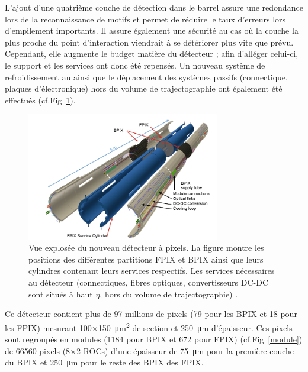 L'ajout d'une quatrième couche de détection dans le barrel assure une redondance lors de la reconnaissance de motifs et permet de réduire le taux d'erreurs lors d'empilement importants. Il assure également une sécurité au cas où la couche la plus proche du point d'interaction viendrait à se détériorer plus vite que prévu. Cependant, elle augmente le budget matière du détecteur ; afin d'alléger celui-ci, le support et les services ont donc été repensés. Un nouveau système de refroidissement au  ainsi que le déplacement des systèmes passifs (connectique, plaques d'électronique) hors du volume de trajectographie ont également été effectués (cf.Fig~\ref{pixel2}).

\begin{figure}[ht!]
	\centering
	\includegraphics[width=0.75\textwidth]{CMS/pixel3.png}
	\captionsetup{type=figure}\caption{Vue explosée du nouveau détecteur à pixels. La figure montre les positions des différentes partitions FPIX et BPIX ainsi que leurs cylindres contenant leurs services respectifs. Les services nécessaires au détecteur (connectiques, fibres optiques, convertisseurs DC-DC sont situés à haut $\eta$, hors du volume de trajectographie) \cite{Dominguez:1481838}.}
	\label{pixel2}
\end{figure}

Ce détecteur contient plus de \num{97} millions de pixels (\num{79} pour les BPIX et \num{18} pour les FPIX) mesurant \num{100}$\times$\SI{150}{\square\micro\meter} de section et \SI{250}{\micro\meter} d'épaisseur. Ces pixels sont regroupés en modules (\num{1184} pour BPIX et \num{672} pour FPIX) (cf.Fig~\ref{module}) de \num{66560} pixels  (\num{8}$\times$\num{2} ROCs) d'une épaisseur de \SI{75}{\micro\meter} pour la première couche du BPIX et \SI{250}{\micro\meter} pour le reste des BPIX des FPIX.

